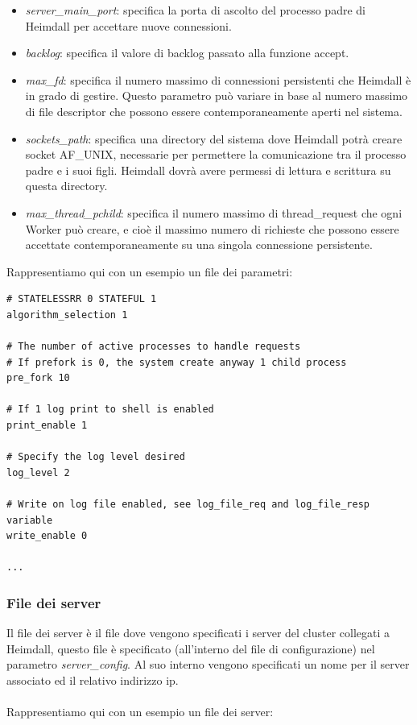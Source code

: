 \documentclass[italian]{tktltiki2}
\begin{document}
\begin{itemize}
	\item \emph{server\_main\_port}: specifica la porta di ascolto del processo padre di Heimdall per accettare nuove connessioni.
			
	\item \emph{backlog}: specifica il valore di backlog passato alla funzione accept.
	
	\item \emph{max\_fd}: specifica il numero massimo di connessioni persistenti che Heimdall è in grado di gestire. Questo parametro può variare in base al numero massimo di file descriptor che possono essere contemporaneamente aperti nel sistema.
	
	\item \emph{sockets\_path}: specifica una directory del sistema dove Heimdall potrà creare socket AF\_UNIX, necessarie per permettere la comunicazione tra il processo padre e i suoi figli. Heimdall dovrà avere permessi di lettura e scrittura su questa directory.
	
	\item \emph{max\_thread\_pchild}: specifica il numero massimo di thread\_request che ogni Worker può creare, e cioè il massimo numero di richieste che possono essere accettate contemporaneamente su una singola connessione persistente.
\end{itemize}
Rappresentiamo qui con un esempio un file dei parametri:

\begin{lstlisting}
# STATELESSRR 0 STATEFUL 1
algorithm_selection 1

# The number of active processes to handle requests
# If prefork is 0, the system create anyway 1 child process
pre_fork 10

# If 1 log print to shell is enabled
print_enable 1

# Specify the log level desired
log_level 2

# Write on log file enabled, see log_file_req and log_file_resp variable
write_enable 0

...
\end{lstlisting}

\subsubsection{File dei server}
\label{ssec:config_server}
Il file dei server è il file dove vengono specificati i server del cluster collegati a Heimdall, questo file è specificato (all'interno del file di configurazione) nel parametro \emph{server\_config}. Al suo interno vengono specificati un nome per il server associato ed il relativo indirizzo ip.
\\
\\
Rappresentiamo qui con un esempio un file dei server:
\end{document}
